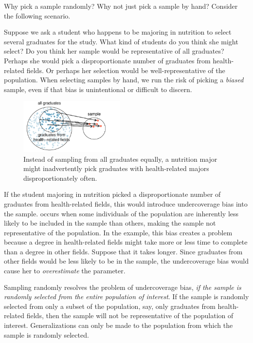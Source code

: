 Why pick a sample randomly? Why not just pick a sample by hand? Consider the following scenario.

\D{\newpage}

\begin{examplewrap}
\begin{nexample}{Suppose we ask a student who happens to be majoring in nutrition to select several graduates for the study. What kind of students do you think she might select? Do you think her sample would be representative of all graduates?}
Perhaps she would pick a disproportionate number of graduates from health-related fields. Or perhaps her selection would be well-representative of the population. When selecting samples by hand, we run the risk of picking a \emph{biased} sample, even if that bias is unintentional or difficult to discern.
\end{nexample}
\end{examplewrap}

\begin{figure}
\centering
\includegraphics[width=0.47\textwidth]{ch_data_collection/figures/popToSample/popToSubSampleGraduates}
\caption{Instead of sampling from all graduates equally, a nutrition major might inadvertently pick graduates with health-related majors disproportionately often.}
\label{popToSubSampleGraduates}
\end{figure}

If the student majoring in nutrition picked a disproportionate number of graduates from health-related fields, this would introduce undercoverage bias into the sample.  occurs when some individuals of the population are inherently less likely to be included in the sample than others, making the sample not representative of the population.  In the example, this bias creates a problem because a degree in health-related fields might take more or less time to complete than a degree in other fields. Suppose that it takes longer. Since graduates from other fields would be less likely to be in the sample, the undercoverage bias would cause her to \emph{overestimate} the parameter.

Sampling randomly resolves the problem of undercoverage bias, \emph{if the sample is randomly selected from the entire population of interest}. If the sample is randomly selected from only a subset of the population, say, only graduates from health-related fields, then the sample will not be representative of the population of interest.  Generalizations can only be made to the population from which the sample is randomly selected.

